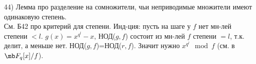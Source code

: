 44) Лемма про разделение на сомножители, чьи неприводимые множители имеют одинаковую степень.\\
См. Б42 про критерий для степени. Инд-ция: пусть на шаге у $f$ нет мн-лей степени $<l$. $g(x)=x^{q^l}-x$, НОД($g, f$) состоит из мн-лей $f$ степени $=l$, т.к. делит, а меньше нет. НОД($g,f$)=НОД($r,f$). Значит нужно $x^{q^l} \mod f$ (см. в $\mb F_q[x]/f$).
\\
